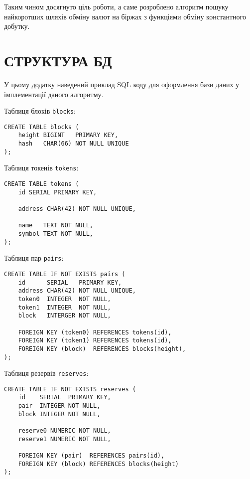 \documentclass[14pt]{extarticle}
\begin{document}
Таким чином досягнуто ціль роботи, а саме розроблено алгоритм пошуку найкоротших
шляхів обміну валют на біржах з функціями обміну константного добутку.

\newpage

\printbibliography[title = ПЕРЕЛІК ДЖЕРЕЛ ПОСИЛАННЯ]{}
\newpage


\section*{СТРУКТУРА БД}\label{appendix:db}

У цьому додатку наведений приклад SQL коду для оформлення бази даних у
імплементації даного алгоритму.

Таблиця блоків \texttt{blocks}:

\begin{verbatim}
CREATE TABLE blocks (
    height BIGINT   PRIMARY KEY,
    hash   CHAR(66) NOT NULL UNIQUE
);
\end{verbatim}

Таблиця токенів \texttt{tokens}:

\begin{verbatim}
CREATE TABLE tokens (
    id SERIAL PRIMARY KEY,

    address CHAR(42) NOT NULL UNIQUE,

    name   TEXT NOT NULL,
    symbol TEXT NOT NULL,
);
\end{verbatim}

Таблиця пар \texttt{pairs}:

\begin{verbatim}
CREATE TABLE IF NOT EXISTS pairs (
    id      SERIAL   PRIMARY KEY,
    address CHAR(42) NOT NULL UNIQUE,
    token0  INTEGER  NOT NULL,
    token1  INTEGER  NOT NULL,
    block   INTERGER NOT NULL,

    FOREIGN KEY (token0) REFERENCES tokens(id),
    FOREIGN KEY (token1) REFERENCES tokens(id),
    FOREIGN KEY (block)  REFERENCES blocks(height),
);
\end{verbatim}

Таблиця резервів \texttt{reserves}:

\begin{verbatim}
CREATE TABLE IF NOT EXISTS reserves (
    id    SERIAL  PRIMARY KEY,
    pair  INTEGER NOT NULL,
    block INTEGER NOT NULL,

    reserve0 NUMERIC NOT NULL,
    reserve1 NUMERIC NOT NULL,

    FOREIGN KEY (pair)  REFERENCES pairs(id),
    FOREIGN KEY (block) REFERENCES blocks(height)
);
\end{verbatim}
\end{document}
